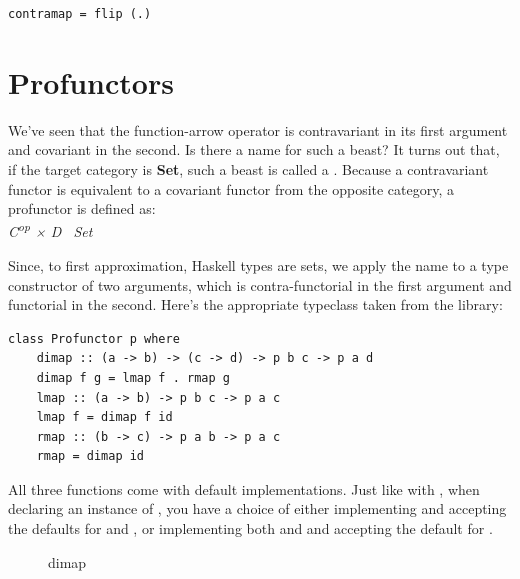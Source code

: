\begin{Verbatim}[commandchars=\\\{\}]
contramap = flip (.)
\end{Verbatim}

\section{Profunctors}\label{profunctors}

We've seen that the function-arrow operator is contravariant in its
first argument and covariant in the second. Is there a name for such a
beast? It turns out that, if the target category is \textbf{Set}, such a
beast is called a . Because a contravariant functor is
equivalent to a covariant functor from the opposite category, a
profunctor is defined as:\\
\emph{C\textsuperscript{op} × D \to\ Set}

Since, to first approximation, Haskell types are sets, we apply the name
 to a type constructor  of two arguments,
which is contra-functorial in the first argument and functorial in the
second. Here's the appropriate typeclass taken from the
 library:

\begin{Verbatim}
class Profunctor p where
    dimap :: (a -> b) -> (c -> d) -> p b c -> p a d
    dimap f g = lmap f . rmap g
    lmap :: (a -> b) -> p b c -> p a c
    lmap f = dimap f id
    rmap :: (b -> c) -> p a b -> p a c
    rmap = dimap id
\end{Verbatim}
All three functions come with default implementations. Just like with
, when declaring an instance of ,
you have a choice of either implementing  and accepting
the defaults for  and , or implementing both
 and  and accepting the default for
.

\begin{figure}[H]
\centering
{}
\caption{dimap}
\end{figure}

